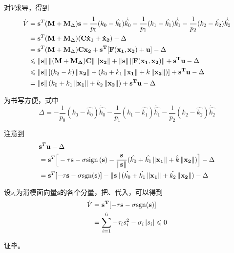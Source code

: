 对$V$求导，得到
\begin{align}\label{eq:Vdot}
    \dot{V}&=\mathbf{s}^T(\mathbf{M}+\mathbf{M}_{\Delta})\mathbf{s}-\frac{1}{p_0}(k_0-\hat{k_0})\dot{\hat{k_0}}-\frac{1}{p_1}(k_1-\hat{k_1})\dot{\hat{k_1}}-\frac{1}{p_2}(k_2-\hat{k_2})\dot{\hat{k_2}} \nonumber
\\&=\mathbf{s}^T(\mathbf{M}+\mathbf{M}_{\Delta})\mathbf{(C\dot{x}_1+\dot{x}_2)} - \Delta \nonumber
\\&=\mathbf{s}^T(\mathbf{M}+\mathbf{M}_{\Delta})\mathbf{Cx_2}+\mathbf{{s^{T}[F(x_1,x_2)+u]}}-\Delta \nonumber
\\& \leqslant \mathbf{\left\lVert s\right\rVert\left\lVert(M+M_{\Delta})C\right\rVert\left\lVert x_2\right\rVert+\left\lVert s\right\rVert\left\lVert F(x_1,x_2)\right\rVert}+\mathbf{s^{T}u}-\Delta \nonumber
\\& \leqslant \left\lVert\mathbf{s}\right\rVert[(k_2-k)\left\lVert\mathbf{x_2}\right\rVert+(k_0+k_1\left\lVert\mathbf{x_1}\right\rVert+k\left\lVert\mathbf{x_2}\right\rVert)]+\mathbf{s^{T}u}-\Delta \nonumber
\\&=\left\lVert\mathbf{s}\right\rVert(k_0+k_1\left\lVert\mathbf{x_1}\right\rVert+k_2\left\lVert\mathbf{x_2}\right\rVert)+\mathbf{s^{T}u}-\Delta 
\end{align}

为书写方便，式中
\begin{equation}\label{eq:Delta}
    \Delta = -\frac{1}{p_0}(k_0-\hat{k_0})\dot{\hat{k_0}}-\frac{1}{p_1}(k_1-\hat{k_1})\dot{\hat{k_1}}-\frac{1}{p_2}(k_2-\hat{k_2})\dot{\hat{k_2}}
\end{equation}

注意到
\begin{align}\label{eq:process1}
&\mathbf{s}^T\mathbf{u}-\Delta \nonumber
\\&= \mathbf{s}^T\Big[-\tau\mathbf{s}-\sigma\mathrm{sign}\,(\mathbf{s})-\frac{\mathbf{s}}{\left\lVert\mathbf{s}\right\rVert}(\hat{k_0}+\hat{k_1}\left\lVert\mathbf{x_1}\right\rVert+\hat{k}\left\lVert\mathbf{x_2}\right\rVert)\Big]-\Delta \nonumber
\\&=\mathbf{s}^T[-\tau \mathbf{s}-\sigma\mathrm{sgn}(\mathbf{s})]-\left\lVert\mathbf{s}\right\rVert(\hat{k_0}+\hat{k_1}\left\lVert\mathbf{x_1}\right\rVert+\hat{k_2}\left\lVert\mathbf{x_2}\right\rVert)-\Delta
\end{align}

设$s_i$为滑模面向量$\mathbf{s}$的各个分量，把、代入，可以得到
\begin{align}\label{eq:V<03-1}
    \dot{V}&=\mathbf{s^{T}[-\tau s-\sigma \mathrm{sgn}(s)]} \nonumber\\
    &=\sum_{i=1}^{6}-\tau_is_i^{2}-\sigma_i\left\lvert s_i\right\rvert\leqslant0
\end{align}

证毕。
\vspace{1em}

